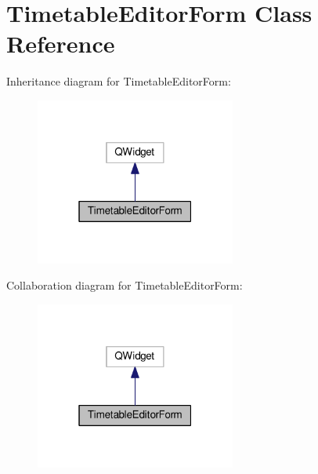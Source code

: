 \hypertarget{class_timetable_editor_form}{}\section{Timetable\+Editor\+Form Class Reference}
\label{class_timetable_editor_form}


Inheritance diagram for Timetable\+Editor\+Form\+:
\nopagebreak
\begin{figure}[H]
\begin{center}
\leavevmode
\includegraphics[width=187pt]{class_timetable_editor_form__inherit__graph}
\end{center}
\end{figure}


Collaboration diagram for Timetable\+Editor\+Form\+:
\nopagebreak
\begin{figure}[H]
\begin{center}
\leavevmode
\includegraphics[width=187pt]{class_timetable_editor_form__coll__graph}
\end{center}
\end{figure}
